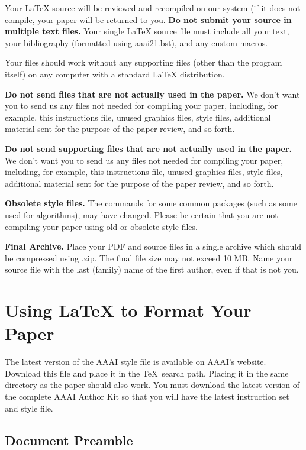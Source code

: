 \documentclass[letterpaper]{article} %
\begin{document}
Your \LaTeX{} source will be reviewed and recompiled on our system (if it does not compile, your paper will be returned to you. \textbf{Do not submit your source in multiple text files.} Your single \LaTeX{} source file must include all your text, your bibliography (formatted using aaai21.bst), and any custom macros.

Your files should work without any supporting files (other than the program itself) on any computer with a standard \LaTeX{} distribution.

\textbf{Do not send files that are not actually used in the paper.} We don't want you to send us any files not needed for compiling your paper, including, for example, this instructions file, unused graphics files, style files, additional material sent for the purpose of the paper review, and so forth.

\textbf{Do not send supporting files that are not actually used in the paper.} We don't want you to send us any files not needed for compiling your paper, including, for example, this instructions file, unused graphics files, style files, additional material sent for the purpose of the paper review, and so forth.

\textbf{Obsolete style files.} The commands for some common packages (such as some used for algorithms), may have changed. Please be certain that you are not compiling your paper using old or obsolete style files.

\textbf{Final Archive.} Place your PDF and source files in a single archive which should be compressed using .zip. The final file size may not exceed 10 MB.
Name your source file with the last (family) name of the first author, even if that is not you.


\section{Using \LaTeX{} to Format Your Paper}

The latest version of the AAAI style file is available on AAAI's website. Download this file and place it in the \TeX\ search path. Placing it in the same directory as the paper should also work. You must download the latest version of the complete AAAI Author Kit so that you will have the latest instruction set and style file.

\subsection{Document Preamble}
\end{document}
